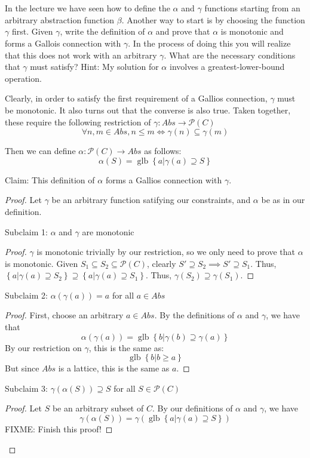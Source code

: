 \documentclass{article}
\newcommand{\problem}[1]
{\subsubsection*{} %
\vspace{-16pt} \section{} \vspace{-22pt} \qquad
#1%
\bigskip \bigskip
}
\newcommand{\powerset}{\mathcal{P}}
\newcommand{\glb}{\operatorname{glb}}
\begin{document}
\problem{In the lecture we have seen how to define the $\alpha$ and $\gamma$
functions starting from an arbitrary abstraction function $\beta$. Another way to
start is by choosing the function $\gamma$ first. Given $\gamma$, write the
definition of $\alpha$ and prove that $\alpha$ is monotonic and forms a Gallois
connection with $\gamma$. In the process of doing this you will realize that this
does not work with an arbitrary $\gamma$. What are the necessary conditions that
$\gamma$ must satisfy? Hint: My solution for $\alpha$ involves a
greatest-lower-bound operation.
}

Clearly, in order to satisfy the first requirement of a Gallios connection,
$\gamma$ must be monotonic.  It also turns out that the converse is also true. 
Taken together, these require the following restriction of
$\gamma : Abs \to \powerset(C)$
\[
\forall n, m \in Abs, n \le m \iff \gamma(n) \subseteq \gamma(m)
\]

Then we can define $\alpha : \powerset(C) \to Abs$ as follows:
\[
\alpha(S) =  \glb \left\{ a | \gamma(a) \supseteq S \right\}
\]

Claim: This definition of $\alpha$ forms a Gallios connection with $\gamma$.
\begin{proof}
Let $\gamma$ be an arbitrary function satifying our constraints, and $\alpha$
be as in our definition.

Subclaim 1: $\alpha$ and $\gamma$ are monotonic
\begin{proof}
$\gamma$ is monotonic trivially by our restriction, so we only need to prove
that $\alpha$ is monotonic.
Given $S_1 \subseteq S_2 \subseteq \powerset(C)$, clearly
$S' \supseteq S_2 \implies S' \supseteq S_1$.
Thus, 
$
\left\{ a | \gamma(a) \supseteq S_2 \right\} \supseteq \left\{ a | \gamma(a)
\supseteq S_1 \right\}.
$
 Thus,
$\gamma(S_2) \supseteq \gamma(S_1)$.
\end{proof}

Subclaim 2: $\alpha(\gamma(a)) = a$ for all $a \in Abs$
\begin{proof}
First, choose an arbitrary $a \in Abs$.
By the definitions of $\alpha$ and $\gamma$, we have that
\[
\alpha(\gamma(a)) = \glb \left\{ b | \gamma(b) \supseteq \gamma(a) \right\}
\]
By our restriction on $\gamma$, this is the same as:
\[
\glb \left\{ b | b \ge a \right\}
\]
But since $Abs$ is a lattice, this is the same as $a$.
\end{proof}

Subclaim 3: $\gamma(\alpha(S)) \supseteq S$ for all $S \in \powerset(C)$
\begin{proof}
Let $S$ be an arbitrary subset of $C$.
By our definitions of $\alpha$ and $\gamma$, we have
\[
\gamma(\alpha(S)) =  \gamma( \glb \left\{ a | \gamma(a) \supseteq S \right\} )
\]
FIXME:  Finish this proof!
\end{proof}

\end{proof}
\end{document}
